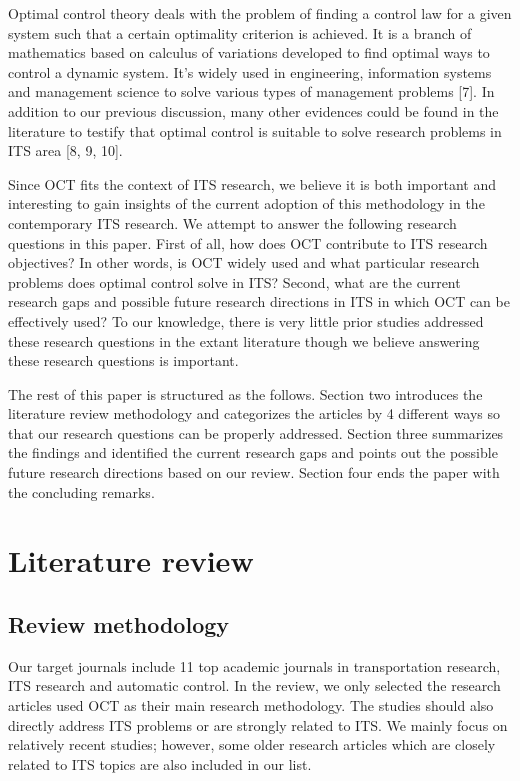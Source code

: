 \documentclass[12pt,onecolumn,twoside]{JCTA}
\theoremstyle{mystyle}
\begin{document}
Optimal control theory deals with the problem of finding a control law for a given system such that a certain optimality criterion is achieved. It is a branch of mathematics based on calculus of variations developed to find optimal ways to control a dynamic system. It{\textquoteright}s widely used in engineering, information systems and management science to solve various types of management problems [7]. In addition to our previous discussion, many other evidences could be found in the literature to testify that optimal control is suitable to solve research problems in ITS area [8, 9, 10].

Since OCT fits the context of ITS research, we believe it is both important and interesting to gain insights of the current adoption of this methodology in the contemporary ITS research. We attempt to answer the following research questions in this paper. First of all, how does OCT contribute to ITS research objectives? In other words, is OCT widely used and what particular research problems does optimal control solve in ITS? Second, what are the current research gaps and possible future research directions in ITS in which OCT can be effectively used? To our knowledge, there is very little prior studies addressed these research questions in the extant literature though we believe answering these research questions is important.

The rest of this paper is structured as the follows. Section two introduces the literature review methodology and categorizes the articles by 4 different ways so that our research questions can be properly addressed. Section three summarizes the findings and identified the current research gaps and points out the possible future research directions based on our review. Section four ends the paper with the concluding remarks.

\section{Literature review}
\subsection{Review methodology}
Our target journals include 11 top academic journals in transportation research, ITS research and automatic control. In the review, we only selected the research articles used OCT as their main research methodology. The studies should also directly address ITS problems or are strongly related to ITS. We mainly focus on relatively recent studies; however, some older research articles which are closely related to ITS topics are also included in our list.
\end{document}
